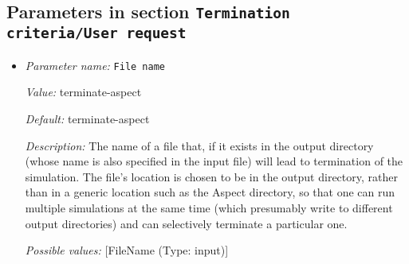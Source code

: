 \subsection{Parameters in section \tt Termination criteria/User request}
\label{parameters:Termination_20criteria/User_20request}

\begin{itemize}
\item {\it Parameter name:} {\tt File name}
\label{parameters:Termination criteria/User request/File name}


{\it Value:} terminate-aspect


{\it Default:} terminate-aspect


{\it Description:} The name of a file that, if it exists in the output directory (whose name is also specified in the input file) will lead to termination of the simulation. The file's location is chosen to be in the output directory, rather than in a generic location such as the Aspect directory, so that one can run multiple simulations at the same time (which presumably write to different output directories) and can selectively terminate a particular one.


{\it Possible values:} [FileName (Type: input)]
\end{itemize}
